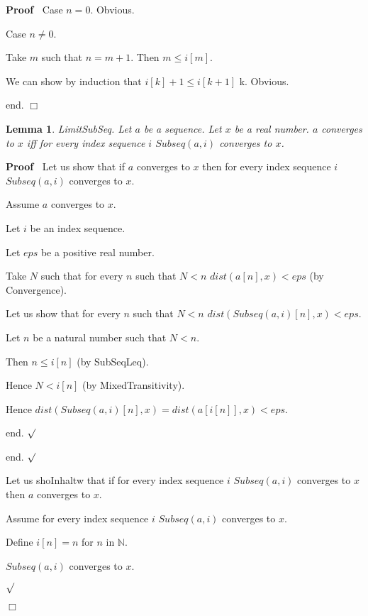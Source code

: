 \documentclass{article}
\newenvironment{forthel}{\begin{leftbar}}{\end{leftbar}}
\newenvironment{proof}{\noindent\textbf{Proof\ }}{\hspace*{\fill}$\Box$\medskip}
\newenvironment{subproof}{\begin{list}{}{}
		\item[\text{Proof}]}{\hfill $\surd$ \end{list}}
\newtheorem{lemma}{Lemma}
\newcommand{\NN}{\mathbb{N}}
\begin{document}
\begin{forthel}
\begin{proof}
		Case $n = 0$. Obvious.
		 
		Case $n \neq 0$.
		
		Take $m$ such that $n = m + 1$. Then $m \leq i[m]$. 
		
		We can show by induction that $i[k] + 1 \leq i[k + 1]$ k. Obvious.
		
		end.
	\end{proof}
	
	\begin{lemma}
		LimitSubSeq.
		Let $a$ be a sequence. Let $x$ be a real number. $a$ converges to $x$ iff for every index sequence $i$ $Subseq(a,i)$ converges to $x$.
	\end{lemma}
	\begin{proof}
		Let us show that if $a$ converges to $x$ then for every index sequence $i$ $Subseq(a,i)$ converges to $x$.
		
		\begin{subproof}
			Assume $a$ converges to $x$.
			
			Let $i$ be an index sequence.
			
			Let $eps$ be a positive real number.
			
			Take $N$ such that for every $n$ such that $N < n$ $dist(a[n],x) < eps$ (by Convergence).
		
			Let us show that for every $n$ such that $N < n$ $dist(Subseq(a,i)[n],x) < eps$.
			
			\begin{subproof}
				Let $n$ be a natural number such that $N < n$.
				
				Then $n \leq i[n]$ (by SubSeqLeq).
				
				Hence $N < i[n]$ (by MixedTransitivity).
				
				Hence $dist(Subseq(a,i)[n],x) = dist(a[i[n]],x) < eps$.
				
				end.
			\end{subproof}
		
			end.
		\end{subproof}
	
		Let us shoInhaltw that if for every index sequence $i$ $Subseq(a,i)$ converges to $x$ then $a$ converges to $x$.
		
		\begin{subproof}
			Assume for every index sequence $i$ $Subseq(a,i)$ converges to $x$.
		
			Define $i[n] = n$ for $n$ in $\NN$.
		
			$Subseq(a,i)$ converges to $x$.
		

\end{subproof}
\end{proof}
\end{forthel}
\end{document}

